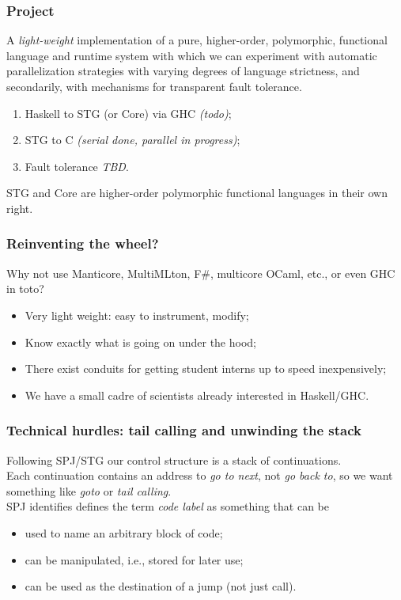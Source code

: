 \documentclass{beamer}
\begin{document}
\begin{frame}
\frametitle{Project} 
A \emph{light-weight} implementation of a pure, higher-order, polymorphic,
functional language and runtime system with which we can experiment with
automatic parallelization strategies with varying degrees of language
strictness, and secondarily, with mechanisms for transparent fault tolerance.
\begin{enumerate}
\item Haskell to STG (or Core) via GHC \emph{(todo)};
\item STG to C \emph{(serial done, parallel in progress)};
\item Fault tolerance \emph{TBD}.
\end{enumerate}
STG and Core are higher-order polymorphic functional languages in their own right.
\end{frame}


\begin{frame}
\frametitle{Reinventing the wheel?}  Why not use Manticore, MultiMLton, F\#,
multicore OCaml, etc., or even GHC in toto?
\begin{itemize}
  \item Very light weight:  easy to instrument, modify;
  \item Know exactly what is going on under the hood;
  \item There exist conduits for getting student interns up to speed inexpensively;
  \item We have a small cadre of scientists already interested in Haskell/GHC.
\end{itemize}
\end{frame}


\begin{frame}
\frametitle{Technical hurdles:  tail calling and unwinding the stack}
Following SPJ/STG our control structure is a stack of continuations.  
\\\vspace{0.1in}
Each continuation contains an address to \emph{go to next}, not \emph{go back
  to}, so we want something like \emph{goto} or \emph{tail calling}.
\\\vspace{0.1in}
SPJ identifies defines the term \emph{code label} as something that can be
\begin{itemize}
  \item used to name an arbitrary block of code;
  \item can be manipulated, i.e., stored for later use;
  \item can be used as the destination of a jump (not just call).
\end{itemize}
\end{frame}
\end{document}
